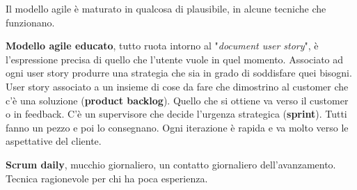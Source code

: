 Il modello agile è maturato in qualcosa di plausibile, in alcune tecniche che funzionano.

\textbf{Modello agile educato}, tutto ruota intorno al "\textit{document user story}", è l'espressione precisa di quello che l'utente vuole in quel momento. Associato ad ogni user story produrre una strategia che sia in grado di soddisfare quei bisogni. User story associato a un insieme di cose da fare che dimostrino al customer che c'è una soluzione (\textbf{product backlog}). Quello che si ottiene va verso il customer o in feedback. C'è un supervisore che decide l'urgenza strategica (\textbf{sprint}). Tutti fanno un pezzo e poi lo consegnano. Ogni iterazione è rapida e va molto verso le aspettative del cliente.

\textbf{Scrum daily}, mucchio giornaliero, un contatto giornaliero dell'avanzamento. Tecnica ragionevole per chi ha poca esperienza.